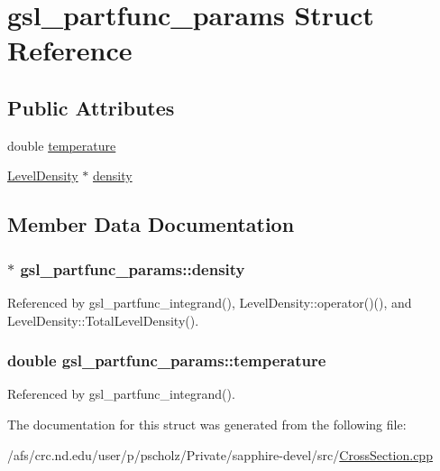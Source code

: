 \hypertarget{structgsl__partfunc__params}{\section{gsl\-\_\-partfunc\-\_\-params Struct Reference}
\label{structgsl__partfunc__params}
}
\subsection*{Public Attributes}
\begin{DoxyCompactItemize}
\item 
double \hyperlink{structgsl__partfunc__params_ae8330967c4990a3497f423816f9ccccf}{temperature}
\item 
\hyperlink{classLevelDensity}{Level\-Density} $\ast$ \hyperlink{structgsl__partfunc__params_adbaf4c10b4af6cc003d74c80895ebfb8}{density}
\end{DoxyCompactItemize}


\subsection{Member Data Documentation}
\hypertarget{structgsl__partfunc__params_adbaf4c10b4af6cc003d74c80895ebfb8}{
\subsubsection[{density}]{$\ast$ gsl\-\_\-partfunc\-\_\-params\-::density}}\label{structgsl__partfunc__params_adbaf4c10b4af6cc003d74c80895ebfb8}


Referenced by gsl\-\_\-partfunc\-\_\-integrand(), Level\-Density\-::operator()(), and Level\-Density\-::\-Total\-Level\-Density().

\hypertarget{structgsl__partfunc__params_ae8330967c4990a3497f423816f9ccccf}{
\subsubsection[{temperature}]{\setlength{\rightskip}{0pt plus 5cm}double gsl\-\_\-partfunc\-\_\-params\-::temperature}}\label{structgsl__partfunc__params_ae8330967c4990a3497f423816f9ccccf}


Referenced by gsl\-\_\-partfunc\-\_\-integrand().



The documentation for this struct was generated from the following file\-:\begin{DoxyCompactItemize}
\item 
/afs/crc.\-nd.\-edu/user/p/pscholz/\-Private/sapphire-\/devel/src/\hyperlink{CrossSection_8cpp}{Cross\-Section.\-cpp}\end{DoxyCompactItemize}
